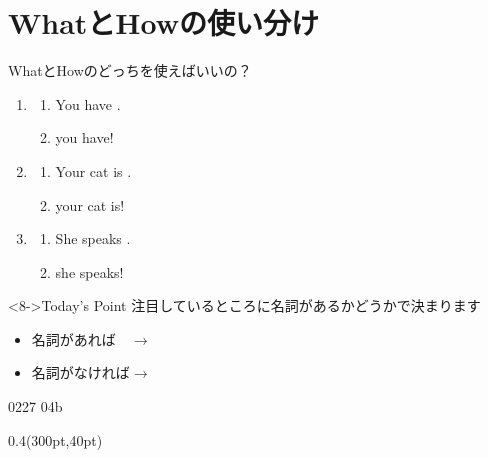 \documentclass[aspectratio=169,xcolor={dvipsnames,table}]{beamer}
\begin{document}
\section{WhatとHowの使い分け}
\begin{frame}[plain]{WhatとHowのどっちを使えばいいの？}
  \hypertarget{USAGE}{}
  \begin{enumerate}
    \item<1-> \begin{enumerate}
            \item<1-> You have .
            \item<2->  you have!
          \end{enumerate}
    \item<3-> \begin{enumerate}
            \item<3-> Your cat is .
            \item<4->  your cat is!
          \end{enumerate}
    \item<5-> \begin{enumerate}
            \item<5-> She speaks .
            \item<6->  she speaks!
          \end{enumerate}
  \end{enumerate}

  \begin{block}<8->{Today's Point}\small
    注目しているところに名詞があるかどうかで決まります
    \begin{itemize}[square]\small
      \item 名詞があれば　$\longrightarrow$ 
      \item 名詞がなければ$\longrightarrow$ 
    \end{itemize}
  \end{block}
  \vspace*{-5pt}
  \hfill{\tiny 0227}\,{\scriptsize {}}\,{\tiny 04b}

  \hfill\hyperlink{HOW}{}%
  \hspace{10pt}\hyperlink{WHAT}{}

  \begin{textblock*}{0.4\linewidth}(300pt,40pt)
  \end{textblock*}
\end{frame}
\end{document}

